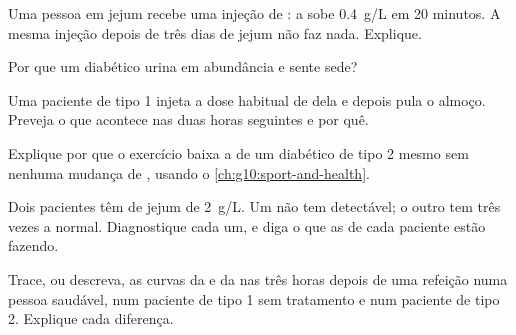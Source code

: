 \begin{exercise}[$\star\star$]\label{exo:g12:glucose-and-diabetes:8}
Uma pessoa em jejum recebe uma injeção de : a  sobe
\qty{0.4}{g/L} em 20 minutos. A mesma injeção depois de três dias de
jejum não faz nada. Explique.
\end{exercise}

\begin{exercise}[$\star\star$]\label{exo:g12:glucose-and-diabetes:9}
Por que um diabético urina em abundância e sente sede?
\end{exercise}

\begin{exercise}[$\star\star$]\label{exo:g12:glucose-and-diabetes:10}
Uma paciente de tipo 1 injeta a dose habitual de  dela e depois
pula o almoço. Preveja o que acontece nas duas horas seguintes e por quê.
\end{exercise}

\begin{exercise}[$\star\star$]\label{exo:g12:glucose-and-diabetes:11}
Explique por que o exercício baixa a  de um diabético de tipo 2
mesmo sem nenhuma mudança de , usando o
\cref{ch:g10:sport-and-health}.
\end{exercise}

\begin{exercise}[$\star\star\star$]\label{exo:g12:glucose-and-diabetes:12}
Dois pacientes têm  de jejum de \qty{2}{g/L}. Um não tem
 detectável; o outro tem três vezes a  normal.
Diagnostique cada um, e diga o que as  de cada paciente estão fazendo.
\end{exercise}

\begin{exercise}[$\star\star\star$]\label{exo:g12:glucose-and-diabetes:13}
Trace, ou descreva, as curvas da  e da  nas três horas
depois de uma refeição numa pessoa saudável, num paciente de tipo 1 sem
tratamento e num paciente de tipo 2. Explique cada diferença.
\end{exercise}

